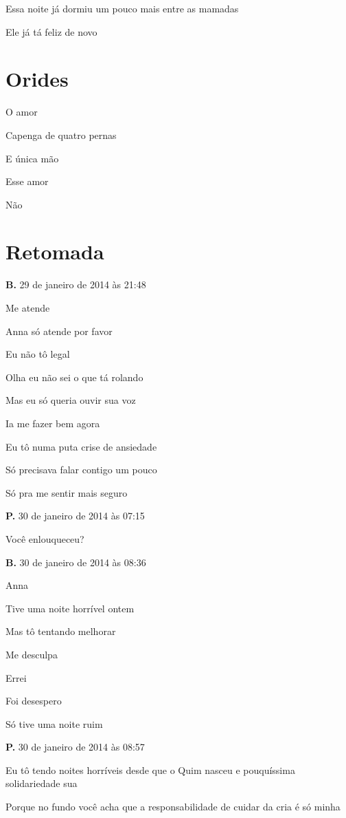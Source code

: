 {{Essa noite já dormiu um pouco mais entre as mamadas

Ele já tá feliz de novo


\chapter{Orides}\label{orides}

O amor

Capenga de quatro pernas

E única mão

Esse amor

Não
}




\chapter{Retomada}

{\parindent0pt\parskip1pt\raggedright
\textbf{B.} 29 de janeiro de 2014 às 21:48

Me atende

Anna só atende por favor

Eu não tô legal

Olha eu não sei o que tá rolando

Mas eu só queria ouvir sua voz

Ia me fazer bem agora

Eu tô numa puta crise de ansiedade

Só precisava falar contigo um pouco

Só pra me sentir mais seguro

\textbf{P.} 30 de janeiro de 2014 às 07:15

Você enlouqueceu?

\textbf{B.} 30 de janeiro de 2014 às 08:36

Anna

Tive uma noite horrível ontem

Mas tô tentando melhorar

Me desculpa

Errei

Foi desespero

Só tive uma noite ruim

\textbf{P.} 30 de janeiro de 2014 às 08:57

Eu tô tendo noites horríveis desde que o Quim nasceu e pouquíssima
solidariedade sua

Porque no fundo você acha que a responsabilidade de cuidar da cria é só
minha

}}
